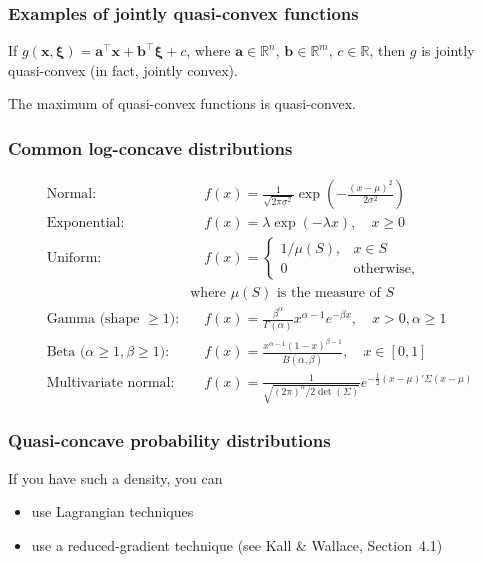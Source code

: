 \documentclass{beamer}
\begin{document}
\begin{frame}
\frametitle{Examples of jointly quasi-convex functions}

\begin{example}
	If $g(\mathbf{x}, \boldsymbol{\xi}) = \mathbf{a}^\top \mathbf{x} + \mathbf{b}^\top \boldsymbol{\xi} + c$, where $\mathbf{a} \in \mathbb{R}^n$, $\mathbf{b} \in \mathbb{R}^m$, $c \in \mathbb{R}$, then $g$ is jointly quasi-convex (in fact, jointly convex).
\end{example}

\begin{example}[Maximum]
The maximum of quasi-convex functions is quasi-convex.
\end{example}

\end{frame}

\begin{frame}
\frametitle{Common log-concave distributions}

\begin{align*}
	\text{Normal:} &\quad f(x) = \frac{1}{\sqrt{2\pi\sigma^2}} \exp\left(-\frac{(x-\mu)^2}{2\sigma^2}\right) \\
	\text{Exponential:} &\quad f(x) = \lambda \exp(-\lambda x), \quad x \geq 0 \\
	\text{Uniform:} &\quad f(x) = \begin{cases}
		1/\mu(S), & x \in S \\
		0 & \mbox{otherwise},
	\end{cases}\\
& \text{where $\mu(S)$ is the measure of $S$}
	 \\
	\text{Gamma (shape $\geq 1$):} &\quad f(x) = \frac{\beta^\alpha}{\Gamma(\alpha)} x^{\alpha-1} e^{-\beta x}, \quad x > 0, \alpha \geq 1 \\
	\text{Beta ($\alpha \geq 1, \beta \geq 1$):} &\quad f(x) = \frac{x^{\alpha-1}(1-x)^{\beta-1}}{B(\alpha,\beta)}, \quad x \in [0,1]\\
\text{Multivariate normal:} &\quad
f(x) = \frac{1}{\sqrt{(2\pi)^n/2\det(\Sigma)}}e^{-\frac{1}{2}(x-\mu)'\Sigma (x-\mu)}
\end{align*}

\end{frame}

\begin{frame}
\frametitle{Quasi-concave probability distributions}

If you have such a density, you can
\begin{itemize}
\item
use Lagrangian techniques
\item
use a reduced-gradient technique (see Kall \& Wallace, Section~4.1)
\end{itemize}

\end{frame}
\end{document}

